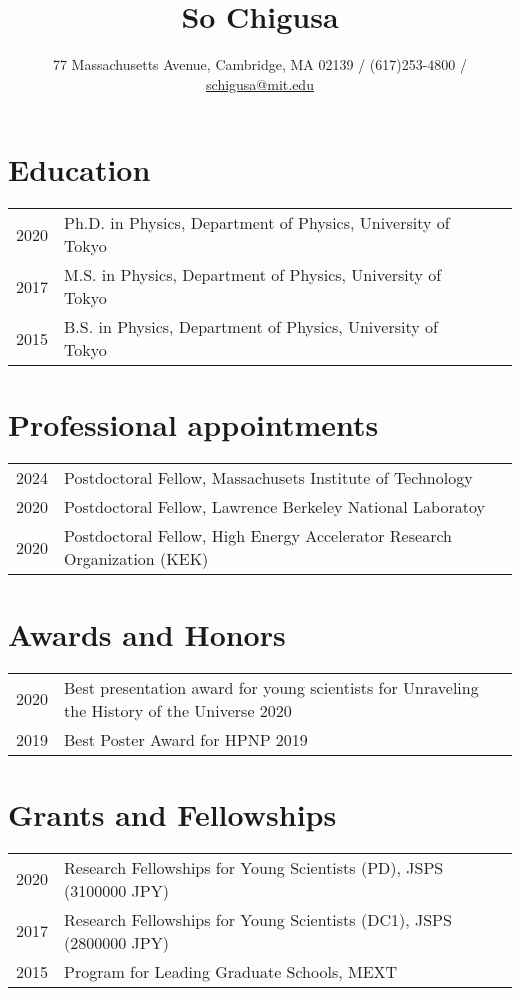 \documentclass[12pt]{article}
\title{{\Large So Chigusa}}
\author{77 Massachusetts Avenue, Cambridge, MA 02139 / (617)253-4800 / \href{mailto:schigusa@mit.edu}{schigusa@mit.edu}}
\date{\vspace{-.5in}}
\begin{document}
\maketitle

\section*{Education}
\begin{table}[h]
 \begin{tabular}{llll}
  2020 & Ph.D. in Physics, Department of Physics, University of Tokyo \\
  2017 & M.S. in Physics, Department of Physics, University of Tokyo \\
  2015 & B.S. in Physics, Department of Physics, University of Tokyo
 \end{tabular}
\end{table}

\section*{Professional appointments}
\begin{table}[h]
  \begin{tabular}{ll}
    2024 & Postdoctoral Fellow, Massachusets Institute of Technology \\
    2020 & Postdoctoral Fellow, Lawrence Berkeley National Laboratoy \\
    2020 & Postdoctoral Fellow, High Energy Accelerator Research Organization (KEK)
  \end{tabular}
\end{table}

\section*{Awards and Honors}
\begin{table}[h]
  \begin{tabular}{ll}
    2020 & Best presentation award for young scientists for Unraveling the History of the Universe 2020 \\ 2019 & Best Poster Award for HPNP 2019
  \end{tabular}
\end{table}

\section*{Grants and Fellowships}
\begin{table}[H]
  \begin{tabular}{ll}
    2020 & Research Fellowships for Young Scientists (PD), JSPS (3100000 JPY) \\
    2017 & Research Fellowships for Young Scientists (DC1), JSPS (2800000 JPY) \\
    2015 & Program for Leading Graduate Schools, MEXT
  \end{tabular}
\end{table}
\end{document}
